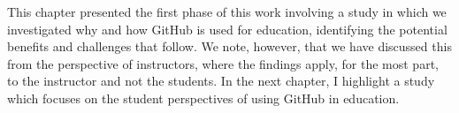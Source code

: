 This chapter presented the first phase of this work involving a study in which we investigated why and how GitHub is used for education, identifying the potential benefits and challenges that follow. We note, however, that we have discussed this from the perspective of instructors, where the findings apply, for the most part, to the instructor and not the students. In the next chapter, I highlight a study which focuses on the student perspectives of using GitHub in education.
